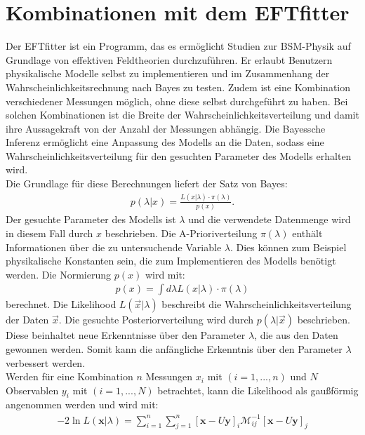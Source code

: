 \section{Kombinationen mit dem EFTfitter}
Der EFTfitter\cite{Castro:2016jjv} ist ein Programm, das es ermöglicht Studien zur BSM-Physik auf Grundlage von effektiven Feldtheorien durchzuführen. Er erlaubt Benutzern physikalische Modelle selbst zu implementieren und im
Zusammenhang der Wahrscheinlichkeitsrechnung nach Bayes zu testen. Zudem ist eine Kombination verschiedener Messungen möglich, ohne diese selbst durchgeführt zu haben.
Bei solchen Kombinationen ist die Breite der Wahrscheinlichkeitsverteilung und damit ihre Aussagekraft von der Anzahl der Messungen abhängig.
Die Bayessche Inferenz ermöglicht eine Anpassung des Modells an die Daten, sodass eine Wahrscheinlichkeitsverteilung für den gesuchten Parameter des Modells erhalten wird.\\
Die Grundlage für diese Berechnungen liefert der Satz von Bayes:
\begin{align}
  p(\lambda|x) = \frac{L(x|\lambda) \cdot \pi(\lambda)}{p(x)}.
\end{align}
Der gesuchte Parameter des Modells ist $\lambda$ und die verwendete Datenmenge wird in diesem Fall durch $x$ beschrieben. Die A-Prioriverteilung $\pi(\lambda)$ enthält Informationen über die zu untersuchende Variable $\lambda$. Dies können zum Beispiel physikalische Konstanten sein, die zum Implementieren des Modells benötigt werden.
Die Normierung $p(x)$ wird mit:
\begin{align}
  p(x) = \int d\lambda L(x|\lambda) \cdot \pi(\lambda)
\end{align}
berechnet. Die Likelihood $L(\vec{x}|\lambda)$ beschreibt die Wahrscheinlichkeitsverteilung der Daten $\vec{x}$. Die gesuchte Posteriorverteilung wird durch $p(\lambda|\vec{x})$ beschrieben. Diese beinhaltet neue Erkenntnisse über den Parameter $\lambda$, die aus den Daten gewonnen werden. Somit kann die anfängliche Erkenntnis über den Parameter $\lambda$ verbessert werden.\\
Werden für eine Kombination $n$ Messungen $x_i$ mit $(i= 1,...,n)$ und $N$ Observablen $y_i$ mit $(i= 1,...,N)$ betrachtet, kann die Likelihood als gaußförmig angenommen werden und wird mit:
\begin{align}
  -2 \ln{L(\mathbf{x}|\lambda)} = \sum^{n}_{i=1} \sum^{n}_{j=1} \left[\mathbf{x} - U\mathbf{y}\right]_{i} \mathcal{M}_{ij}^{-1} \left[\mathbf{x} - U\mathbf{y}\right]_{j}
  \label{eqn:like}
\end{align}
